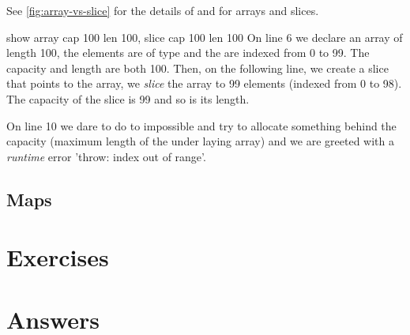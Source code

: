 See \ref{fig:array-vs-slice} for the details of  and
 for arrays and slices.

show 
array cap 100 len 100, slice cap 100 len 100
On line 6 we declare an array of length 100, the elements are of
type  and the are indexed from 0 to 99. The capacity
and length are both 100. Then, on the following line, we create
a slice that points to the array, we \emph{slice} the array to
99 elements (indexed from 0 to 98). The capacity of the slice
is 99 and so is its length. 

On line 10 we dare to do to impossible and try to allocate something
behind the capacity (maximum length of the under laying array) and
we are greeted with a \emph{runtime} error 'throw: index out of range'.

\subsection{Maps}
\label{sec:maps}

\section{Exercises}




\cleardoublepage
\section{Answers}
\shipoutAnswer

